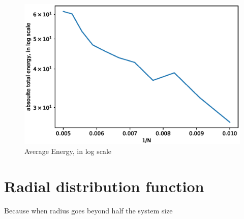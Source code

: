 \documentclass[UTF8,a4paper]{article}
\begin{document}
\begin{figure}[H]
\begin{minipage}[t]{0.6\textwidth}
		\centering
		\includegraphics[height=0.2\textheight]{fig/sc_exp2_loge_hard.eps}
		\caption{Average Energy, in log scale}
	\end{minipage}
\end{figure}

\section{Radial distribution function}
Because when radius goes beyond half the system size
\end{document}
